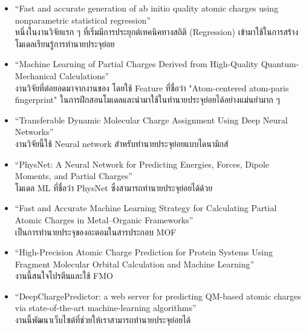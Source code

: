 \begin{itemize}
    \item \enquote{Fast and accurate generation of ab initio quality atomic charges using nonparametric statistical 
    regression}\autocite{rai2013} \\ 
    หนึ่งในงานวิจัยแรก ๆ ที่เริ่มมีการประยุกต์เทคนิคทางสถิติ (Regression) เข้ามาใช้ในการสร้างโมเดลเรียนรู้การทำนายประจุย่อย
    
    \item \enquote{Machine Learning of Partial Charges Derived from High-Quality Quantum-Mechanical Calculations} 
    \autocite{bleiziffer2018} \\
    งานวิจัยที่ต่อยอดมาจากงานของ โดยใช้ Feature ที่ชื่อว่า "Atom-centered atom-paris fingerprint"\autocite{carhart1985} 
    ในการฝึกสอนโมเดลและนำมาใช้ในทำนายประจุย่อยได้อย่างแม่นยำมาก ๆ
    
    \item \enquote{Transferable Dynamic Molecular Charge Assignment Using Deep Neural Networks}\autocite{nebgen2018} \\
    งานวิจัยนี้ใช้ Neural network สำหรับทำนายประจุย่อยแบบไดนามิกส์
    
    \item \enquote{PhysNet: A Neural Network for Predicting Energies, Forces, Dipole Moments, and Partial Charges}
    \autocite{unke2019} \\
    โมเดล ML ที่ชื่อว่า PhysNet ซึ่งสามารถทำนายประจุย่อยได้ด้วย
    
    \item \enquote{Fast and Accurate Machine Learning Strategy for Calculating Partial Atomic Charges in Metal–Organic
    Frameworks}\autocite{kancharlapalli2021} \\ 
    เป็นการทำนายประจุของอะตอมในสารประกอบ MOF
    
    \item \enquote{High-Precision Atomic Charge Prediction for Protein Systems Using Fragment Molecular Orbital 
    Calculation and Machine Learning}\autocite{kato2020} \\ 
    งานนี้สนใจโปรตีนและใช้ FMO
    
    \item \enquote{DeepChargePredictor: a web server for predicting QM-based atomic charges via state-of-the-art 
    machine-learning algorithms}\autocite{wang2021} \\ 
    งานนี้พัฒนาเว็บไซต์ที่ช่วยให้เราสามารถทำนายประจุย่อยได้
\end{itemize}

